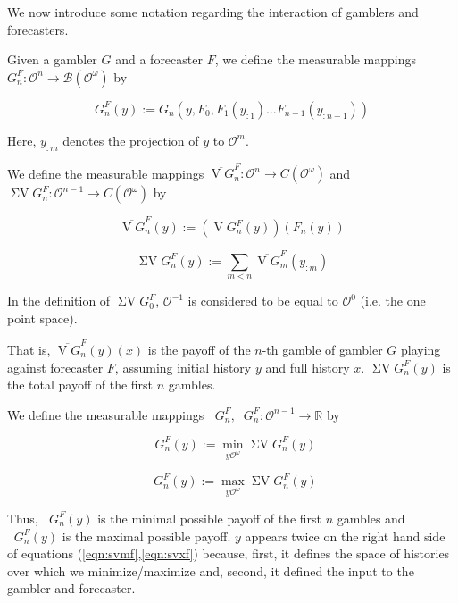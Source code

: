 \documentclass[aop,preprint]{imsart}
\numberwithin{equation}{section}
\theoremstyle{definition}
\theoremstyle{plain}
\newcommand{\Reals}{\mathbb{R}}
\newcommand{\Ob}{\mathcal{O}}
\newcommand{\OO}{\Ob^\omega}
\newcommand{\Gm}{\mathcal{B}}
\newcommand{\GMO}{\Gm(\OO)}
\newcommand{\CO}{C(\OO)}
\DeclareMathOperator{\V}{V}
\DeclareMathOperator{\SV}{\Sigma V}
\DeclareMathOperator{\SVM}{\Sigma V_{\min}}
\DeclareMathOperator{\SVX}{\Sigma V_{\max}}
\begin{document}
We now introduce some notation regarding the interaction of gamblers and forecasters. 

Given a gambler $G$ and a forecaster $F$, we define the measurable mappings $G^F_n: \Ob^n \rightarrow \GMO$ by

\begin{equation}
\label{eqn:GF}
G^F_n\left(y\right):=G_n\left(y,F_0,F_1\left(y_{:1}\right) \ldots F_{n-1}\left(y_{:n-1}\right)\right)
\end{equation}

Here, $y_{:m}$ denotes the projection of $y$ to $\Ob^m$.

We define the measurable mappings $\overline{\V G}^F_n: \Ob^n \rightarrow \CO$ and $\SV G^F_n: \Ob^{n-1} \rightarrow \CO$ by

\begin{equation}
\overline{\V G}^F_n\left(y\right):=\left(\V G^F_n\left(y\right)\right)\left(F_n\left(y\right)\right)
\end{equation}

\begin{equation}
\SV G^F_n\left(y\right) := \sum_{m < n} \overline{\V G}^F_m\left(y_{:m}\right)
\end{equation}

In the definition of $\SV G^F_0$, $\Ob^{-1}$ is considered to be equal to $\Ob^0$ (i.e. the one point space).

That is, $\overline{\V G}^F_n\left(y\right)(x)$ is the payoff of the $n$-th gamble of gambler $G$ playing against forecaster $F$, assuming initial history $y$ and full history $x$. $\SV G^F_n\left(y\right)$ is the total payoff of the first $n$ gambles.

We define the measurable mappings $\SVM G^F_n, \SVX G^F_n: \Ob^{n-1} \rightarrow \Reals$ by

\begin{equation}
\label{eqn:svmf}
\SVM G^F_n\left(y\right):=\min_{y\OO} \SV G^F_n(y)
\end{equation}

\begin{equation}
\label{eqn:svxf}
\SVX G^F_n\left(y\right):=\max_{y\OO} \SV G^F_n(y)
\end{equation}

Thus, $\SVM G^F_n\left(y\right)$ is the minimal possible payoff of the first $n$ gambles and $\SVX G^F_n\left(y\right)$ is the maximal possible payoff. $y$ appears twice on the right hand side of equations (\ref{eqn:svmf},\ref{eqn:svxf}) because, first, it defines the space of histories over which we minimize/maximize and, second, it defined the input to the gambler and forecaster.
\end{document}
